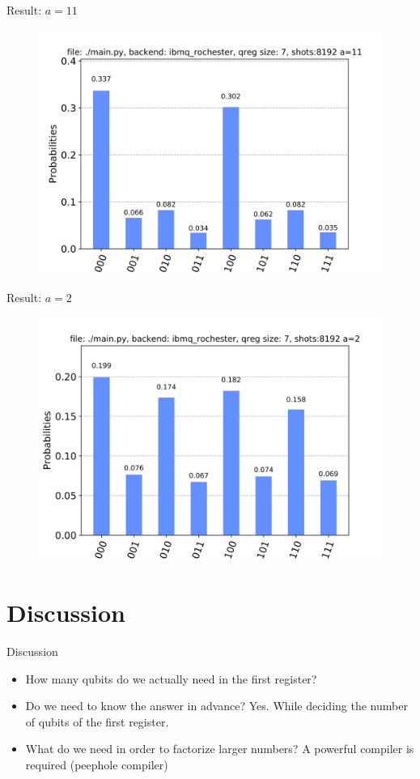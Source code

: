 \documentclass{beamer}
\begin{document}
\begin{frame}{Result: $a=11$}
	\begin{figure}[h]
		\centering
		\includegraphics[width=0.8\linewidth]{./figs/15_11.png}
	\end{figure}
\end{frame}
	
\begin{frame}{Result: $a=2$}
	\begin{figure}[h]
		\centering
		\includegraphics[width=0.8\linewidth]{./figs/15_2.png}
	\end{figure}
\end{frame}

\section{Discussion}%
\label{sec:discussion}

\begin{frame}{Discussion}
	\begin{itemize}
		\item How many qubits do we actually need in the first register?
		\item Do we need to know the answer in advance?
			Yes. While deciding the number of qubits of the first register.
		\item What do we need in order to factorize larger numbers?
			A powerful compiler is required (peephole compiler)
	\end{itemize}
\end{frame}
\end{document}
